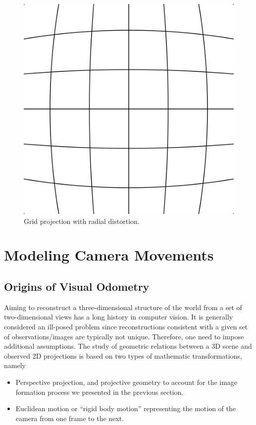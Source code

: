 \begin{figure}[h]
\centering
\includegraphics[width=0.5\columnwidth]{assets/img/barrel_distortion.png}
\caption{Grid projection with radial distortion.}%
\label{fig:radial_distortion}
\end{figure}


\section{Modeling Camera Movements}%
\label{sec:moving-scene}

\subsection{Origins of Visual Odometry}%
\label{sub:origins_of_visual_odometry}

Aiming to reconstruct a three-dimensional structure of the world from
a set of two-dimensional views has a long history in computer vision.
It is generally considered an ill-posed problem since reconstructions
consistent with a given set of observations/images are typically not unique.
Therefore, one need to impose additional assumptions.
The study of geometric relations between a 3D scene
and observed 2D projections is based on two types of mathematic transformations, namely
\begin{itemize}
	\item Perspective projection, and projective geometry to account for the image formation
		process we presented in the previous section.
	\item Euclidean motion or ``rigid body motion''
		representing the motion of the camera from one frame to the next.
\end{itemize}

